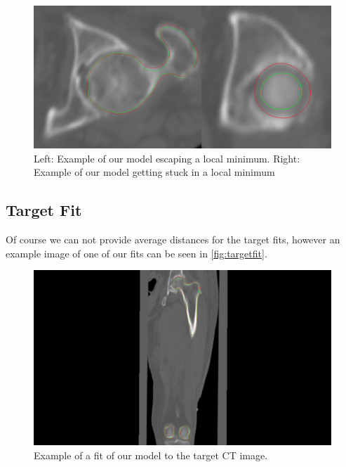 \begin{figure}
	\centering
  \includegraphics[width=\columnwidth]{./Figures/local_minimum_comparison}
  \caption{
    Left: Example of our model escaping a local minimum. Right: Example of our model getting stuck in a local minimum}
  \label{fig:testfit}
\end{figure}

\subsection{Target Fit}
Of course we can not provide average distances for the target fits, however an example image of one of our fits can be seen in \autoref{fig:targetfit}.

\begin{figure}
	\centering
  \includegraphics[width=\columnwidth]{./Figures/local_minimum_y-axis}
  \caption{
    Example of a fit of our model to the target CT image. }
  \label{fig:targetfit}
\end{figure}

